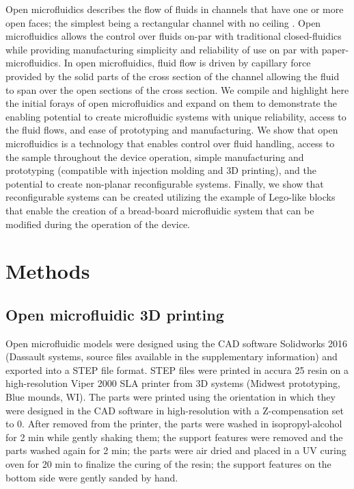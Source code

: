 Open microfluidics describes the flow of fluids in channels that have one or more open faces; the simplest being a rectangular channel with no ceiling \cite{Berthier2012,Casavant2013}. Open microfluidics allows the control over fluids on-par with traditional closed-fluidics while providing manufacturing simplicity and reliability of use on par with paper-microfluidics. In open microfluidics, fluid flow is driven by capillary force provided by the solid parts of the cross section of the channel allowing the fluid to span over the open sections of the cross section. We compile and highlight here the initial forays of open microfluidics and expand on them to demonstrate the enabling potential to create microfluidic systems with unique reliability, access to the fluid flows, and ease of prototyping and manufacturing. We show that open microfluidics is a technology that enables control over fluid handling, access to the sample throughout the device operation, simple manufacturing and prototyping (compatible with injection molding and 3D printing), and the potential to create non-planar reconfigurable systems. Finally, we show that reconfigurable systems can be created utilizing the example of Lego-like blocks that enable the creation of a bread-board microfluidic system that can be modified during the operation of the device.

\section{Methods}
\subsection{Open microfluidic 3D printing}
Open microfluidic models were designed using the CAD software Solidworks 2016 (Dassault systems, source files available in the supplementary information) and exported into a STEP file format. STEP files were printed in accura 25 resin on a high-resolution Viper 2000 SLA printer from 3D systems (Midwest prototyping, Blue mounds, WI). The parts were printed using the orientation in which they were designed in the CAD software in high-resolution with a Z-compensation set to 0. After removed from the printer, the parts were washed in isopropyl-alcohol for 2 min while gently shaking them; the support features were removed and the parts washed again for 2 min; the parts were air dried and placed in a UV curing oven for 20 min to finalize the curing of the resin; the support features on the bottom side were gently sanded by hand.

